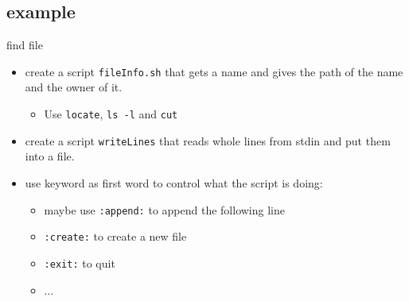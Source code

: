 \documentclass[handout]{beamer}
\newcommand{\code}[1]{\colorbox{lGray}{\texttt{#1}}}
\begin{document}
	\subsection{example}
		\begin{frame}{find file}
			\begin{itemize}
				\item<1-> create a script \code{fileInfo.sh} that gets a name and gives the path of the name and the owner of it.
                \begin{itemize}
                    \item<1-> Use \code{locate}, \code{ls -l} and \code{cut}
                \end{itemize}
            \end{itemize}
		\end{frame}
		\begin{frame}{}
			\begin{itemize}
				\item<1-> create a script \code{writeLines} that reads whole lines from stdin and put them into a file.
                \item<2-> use keyword as first word to control what the script is doing:
                \begin{itemize}
                    \item<2-> maybe use \code{:append:} to append the following line
                    \item<2-> \code{:create:} to create a new file
                    \item<2-> \code{:exit:} to quit
                    \item<2-> ...
                \end{itemize}
            \end{itemize}
		\end{frame}
\end{document}
